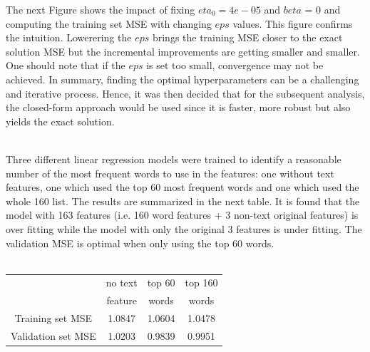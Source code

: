 \documentclass[11pt]{article}
\begin{document}
The next Figure shows the impact of fixing $eta_0 = 4e-05$ and $beta$ = 0 and computing the training set MSE with changing $eps$ values. This figure confirms the intuition. Lowerering the $eps$ brings the training MSE closer to the exact solution MSE but the incremental improvements are getting smaller and smaller. One should note that if the $eps$ is set too small, convergence may not be achieved. In summary, finding the optimal hyperparameters can be a challenging and iterative process. Hence, it was then decided that for the subsequent analysis, the closed-form approach would be used since it is faster, more robust but also yields the exact solution. \\ 
\\

Three different linear regression models were trained to identify a reasonable number of the most frequent words to use in the features: one without text features, one which used the top 60 most frequent words and one which used the whole 160 list. The results are summarized in the next table. It is found that the model with 163 features (i.e. 160 word features + 3 non-text original features) is over fitting while the model with only the original 3 features is under fitting. The validation MSE is optimal when only using the top 60 words.\\ 
\\

\begin{table}[h]
\centering
\begin{small}
\begin{tabular}[c]{|c|c|c|c|}
  \hline
   & no text & top 60 & top 160 \\
   & feature & words & words \\
   \hline
  Training set MSE & 1.0847 & 1.0604 & 1.0478\\
  Validation set MSE & 1.0203 & 0.9839 & 0.9951\\
  \hline
\end{tabular}
\end{small}
\end{table}
\end{document}
